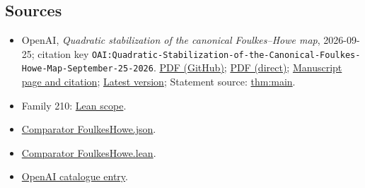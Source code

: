 \documentclass[11pt]{article}
\begin{document}
\subsection{Sources}
\begin{itemize}
\item OpenAI, \emph{Quadratic stabilization of the canonical Foulkes–Howe map}, 2026-09-25; citation key \texttt{OAI:Quadratic-Stabilization-of-the-Canonical-Foulkes-Howe-Map-September-25-2026}. \href{https://github.com/openai/math/blob/adc7f1241b42e322a6451854ab7e4b4c146bf78a/preprints/Quadratic-Stabilization-of-the-Canonical-Foulkes-Howe-Map-September-25-2026/paper.pdf}{PDF (GitHub)}; \href{https://github.com/openai/math/raw/adc7f1241b42e322a6451854ab7e4b4c146bf78a/preprints/Quadratic-Stabilization-of-the-Canonical-Foulkes-Howe-Map-September-25-2026/paper.pdf}{PDF (direct)}; \href{https://github.com/openai/math/blob/adc7f1241b42e322a6451854ab7e4b4c146bf78a/preprints/Quadratic-Stabilization-of-the-Canonical-Foulkes-Howe-Map-September-25-2026/README.md}{Manuscript page and citation}; \href{https://github.com/openai/math/blob/main/preprints/Quadratic-Stabilization-of-the-Canonical-Foulkes-Howe-Map-September-25-2026/paper.pdf}{Latest version}; Statement source: \href{https://github.com/openai/math/blob/adc7f1241b42e322a6451854ab7e4b4c146bf78a/preprints/Quadratic-Stabilization-of-the-Canonical-Foulkes-Howe-Map-September-25-2026/build/paper.tex\#L99}{thm:main}.
\item Family 210: \href{https://github.com/openai/math/blob/adc7f1241b42e322a6451854ab7e4b4c146bf78a/lean/docs/210.md}{Lean scope}.
\item \href{https://github.com/openai/math/blob/adc7f1241b42e322a6451854ab7e4b4c146bf78a/lean/ComparatorChallenges/FoulkesHowe.json}{Comparator FoulkesHowe.json}.
\item \href{https://github.com/openai/math/blob/adc7f1241b42e322a6451854ab7e4b4c146bf78a/lean/ComparatorChallenges/FoulkesHowe.lean}{Comparator FoulkesHowe.lean}.
\item \href{https://github.com/openai/math/blob/adc7f1241b42e322a6451854ab7e4b4c146bf78a/CONTENTS.md}{OpenAI catalogue entry}.
\end{itemize}
\end{document}
